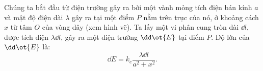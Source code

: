 \begin{vd}
\begin{center}
\end{center}

\end{vd}
\begin{loigiai}
Chúng ta bắt đầu từ điện trường gây ra bởi một vành mỏng tích điện bán kính $a$ và mật độ điện dài $\lambda$ gây ra tại một điểm $P$ nằm trên trục của nó, ở khoảng cách $x$ từ tâm $O$ của vòng dây (xem hình vẽ). Ta lấy một vi phân cung tròn dài $\dd l$, được tích điện $\lambda \dd l$, gây ra một điện trường $\dd \ot{E}$ tại điểm $P$. Độ lớn của $\dd \ot{E}$ là:
   \[ \dd E = k_e \frac{\lambda \dd l}{a^2 + x^2} . \tag{1}\]

    \begin{center}



\begin{tikzpicture}[x=0.75pt,y=0.75pt,yscale=-1,xscale=1]


\end{tikzpicture}
\end{center}
\end{loigiai}
